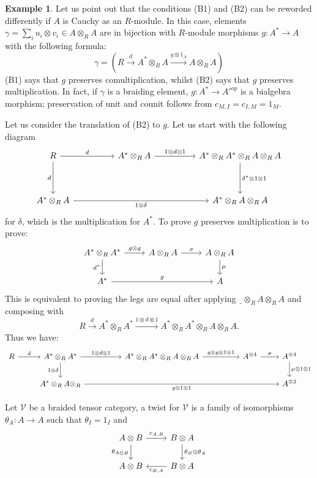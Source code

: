 \documentclass[8pt]{article}
\theoremstyle{definition}
\theoremstyle{definition}
\theoremstyle{definition}
\theoremstyle{definition}
\theoremstyle{definition}
\theoremstyle{definition}
\theoremstyle{definition}
\theoremstyle{definition}
\theoremstyle{definition}
\theoremstyle{definition}
\theoremstyle{definition}
\theoremstyle{definition}
\newtheorem{example}{Example}[section]
\theoremstyle{definition}
\theoremstyle{definition}
\theoremstyle{question}
\begin{document}
\begin{example}
  Let us point out that the conditions (B1) and (B2) can be reworded differently if $A$ is Cauchy as an $R$-module. In this case, 
  elements $\gamma = \sum \limits_{i} u_i \otimes v_i \in A \otimes_R A$ are in bijection with $R$-module morphisms 
  $g : A^* \to A$ with the following formula:
  \[
  \gamma = (R \xrightarrow{d} A^* \otimes_R A \xrightarrow{g \otimes 1_A} A \otimes_R A)
  \]
  (B1) says that $g$ preserves comultiplication, whilst (B2) says that $g$ preserves multiplication. In fact, if $\gamma$ is a braiding
  element, $g : A^* \to {A'}^{op}$ is a bialgebra morphism; preservation of unit and counit follows from $c_{M,I} = c_{I, M} = 1_M$.

  Let us consider the translation of (B2) to $g$. Let us start with the following diagram
  \[
  \begin{tikzcd}
    R \ar[rr, "d"] \ar[dd, "d"'] && A^{*} \otimes_R A \ar[rr, "1 \otimes d \otimes 1"] && A^* \otimes_R A^* \otimes_R A \otimes_R A \ar[dd, "\delta^* \otimes 1 \otimes 1"] \\
    \\
    A^* \otimes_R A \ar[rrrr, "1 \otimes \delta"'] &&&& A^* \otimes_R A \otimes_R A
  \end{tikzcd}
  \]
  for $\delta$, which is the multiplication for $A^*$. To prove $g$ preserves multiplication is to prove:
  \[
  \begin{tikzcd}
  A^* \otimes_R A^* \ar[d, "d^*"'] \ar[r, "g \otimes g"] & A \otimes_R A \ar[r, "\sigma"] & A \otimes_R A \ar[d, "\mu"] \\
  A^* \ar[rr, "g"] && A
  \end{tikzcd}
  \]
  This is equivalent to proving the legs are equal after applying $\underline{\:\:} \otimes_R A \otimes_R A$ and composing with
  \[
  R \xrightarrow{d} A^* \otimes_R A^* \xrightarrow{1 \otimes d \otimes 1} A^* \otimes_R A^* \otimes_R A \otimes_R A.
  \]
  Thus we have:
  \[
  \begin{tikzcd}
    R \ar[r, "d"] & A^* \otimes_R A^* \ar[d, "1 \otimes \delta"'] \ar[rr, "1 \otimes d \otimes 1"] && A^* \otimes_R A^* \otimes_R A \otimes_R A \ar[rr, "g \otimes g \otimes 1 \otimes 1"] && A^{\otimes 4} \ar[r, "\sigma"] & A^{\otimes 4} \ar[d, "\mu \otimes 1 \otimes 1"] \\
    & A^* \otimes_R A \otimes_R \ar[rrrrr, "g \otimes 1 \otimes 1"'] &&&&& A^{\otimes 3}
  \end{tikzcd}
  \]
\end{example}

Let $\mathcal{V}$ be a braided tensor category, a twist for $\mathcal{V}$ is a family of isomorphisms $\theta_A : A \to A$
such that $\theta_I = 1_I$ and
\[
\begin{tikzcd}
  A \otimes B \ar[r, "c_{A,B}"] \ar[d, "\theta_{A \otimes B}"'] & B \otimes A \ar[d, "\theta_B \otimes \theta_A"] \\
  A \otimes B & B \otimes A \ar[l, "c_{B,A}"]
\end{tikzcd}
\]
\end{document}

